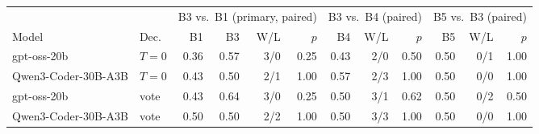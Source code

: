 \begin{tabular}{@{}ll rrrr rrr rrr@{}}\toprule
 & & \multicolumn{4}{c}{B3 vs.\ B1 (primary, paired)} & \multicolumn{3}{c}{B3 vs.\ B4 (paired)} & \multicolumn{3}{c}{B5 vs.\ B3 (paired)} \\
\cmidrule(lr){3-6}\cmidrule(lr){7-9}\cmidrule(lr){10-12}
Model & Dec. & B1 & B3 & W/L & $p$ & B4 & W/L & $p$ & B5 & W/L & $p$ \\ \midrule
gpt-oss-20b & $T{=}0$ & 0.36 & 0.57 & 3/0 & 0.25 & 0.43 & 2/0 & 0.50 & 0.50 & 0/1 & 1.00 \\
Qwen3-Coder-30B-A3B & $T{=}0$ & 0.43 & 0.50 & 2/1 & 1.00 & 0.57 & 2/3 & 1.00 & 0.50 & 0/0 & 1.00 \\
gpt-oss-20b & vote & 0.43 & 0.64 & 3/0 & 0.25 & 0.50 & 3/1 & 0.62 & 0.50 & 0/2 & 0.50 \\
Qwen3-Coder-30B-A3B & vote & 0.50 & 0.50 & 2/2 & 1.00 & 0.50 & 3/3 & 1.00 & 0.50 & 0/0 & 1.00 \\
\bottomrule\end{tabular}